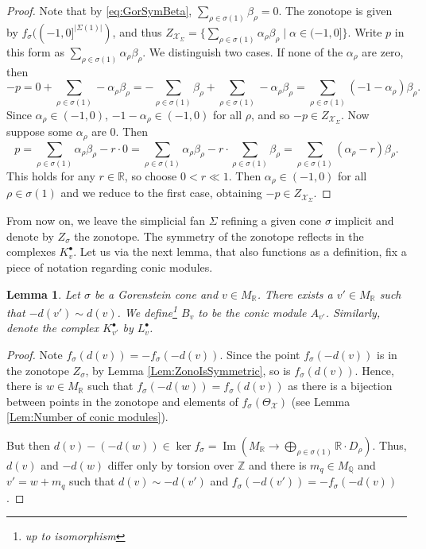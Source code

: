 \documentclass[reqno, 12pt]{amsart}
\newtheorem{lemma}[theorem]{Lemma}
\theoremstyle{definition}
\numberwithin{equation}{section}
\newcommand{\Z}{\mathbb{Z}}
\newcommand{\R}{\mathbb{R}}
\newcommand{\Q}{\mathbb{Q}}
\begin{document}
\begin{proof}
Note that by \eqref{eq:GorSymBeta}, $\sum_{\rho\in\sigma(1)}\beta_\rho=0$.
The zonotope is given by $f_{\sigma}((-1,0]^{|\Sigma(1)|})$, and thus $Z_{\mathcal{X}_\Sigma}=\{\sum_{\rho\in \sigma(1)}\alpha_\rho \beta_\rho\mid \alpha\in (-1,0]\}$. Write $p$ in this form as $\sum_{\rho\in \sigma(1)}\alpha_\rho\beta_\rho$. We distinguish two cases. If none of the $\alpha_\rho$ are zero, then \[
-p=0+\sum_{\rho\in \sigma(1)}-\alpha_\rho\beta_\rho=-\sum_{\rho\in \sigma(1)}\beta_\rho+\sum_{\rho\in \sigma(1)}-\alpha_\rho\beta_\rho=\sum_{\rho\in\sigma(1)}(-1-\alpha_\rho)\beta_\rho.
\]
Since $\alpha_\rho\in (-1,0)$, $-1-\alpha_\rho\in (-1,0)$ for all $\rho$, and so $-p\in Z_{\mathcal{X}_\Sigma}$. Now suppose some $\alpha_\rho$ are 0. Then\[
p=\sum_{\rho\in\sigma(1)}\alpha_\rho\beta_\rho -r\cdot 0=\sum_{\rho\in\sigma(1)}\alpha_\rho\beta_\rho -r\cdot \sum_{\rho\in\sigma(1)}\beta_\rho=\sum_{\rho\in\sigma(1)}(\alpha_\rho -r)\beta_\rho.
\]
This holds for any $r\in \R$, so choose $0<r\ll 1$. Then $\alpha_\rho\in(-1,0)$ for all $\rho\in \sigma(1)$ and we reduce to the first case, obtaining $-p\in Z_{\mathcal{X}_\Sigma}$.
\end{proof}

\noindent From now on, we leave the simplicial fan $\Sigma$ refining a given cone $\sigma$ implicit and denote by $Z_\sigma$ the zonotope. The symmetry of the zonotope reflects in the complexes $K_v^\bullet$. 
Let us via the next lemma, that also functions as a definition, fix a piece of notation regarding conic modules.
\begin{lemma}
    \label{Lem:NegativeModuleExists}
    Let $\sigma$ be a Gorenstein cone and $v\in M_\R$. There exists a $v'\in M_\R$ such that $-d(v')\sim d(v)$. We define\footnote{up to isomorphism} $B_v$ to be the conic module $A_{v'}$. Similarly, denote the complex $K^\bullet_{v'}$ by $L_v^\bullet$.
\end{lemma}

\begin{proof}
    Note $f_\sigma(d(v))=-f_\sigma(-d(v))$. Since the point $f_\sigma(-d(v))$ is in the zonotope $Z_{\sigma}$, by Lemma \ref{Lem:ZonoIsSymmetric}, so is $f_\sigma(d(v))$. Hence, there is $w\in M_\R$ such that $f_\sigma(-d(w))=f_\sigma(d(v))$ as there is a bijection between points in the zonotope and elements of $f_{\sigma}(\Theta_{\mathcal{X}})$ (see Lemma \ref{Lem:Number of conic modules}).

    But then $d(v)-(-d(w))\in \ker f_{\sigma}=\operatorname{Im}(M_\R\rightarrow \bigoplus_{\rho\in \sigma(1)}\R\cdot D_\rho)$. Thus, $d(v)$ and $-d(w)$ differ only by torsion over $\Z$ and there is $m_q\in M_\Q$ and $v'=w+m_q$ such that $d(v)\sim -d(v')$ and $f_\sigma(-d(v'))=-f_\sigma(-d(v))$.
\end{proof}
\end{document}
